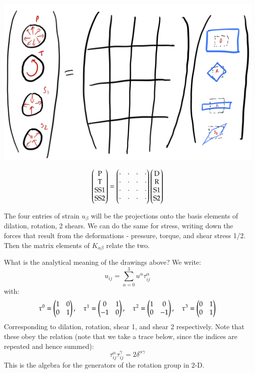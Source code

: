 \begin{center}
    \includegraphics[scale=0.35]{Lectures/Images/lec2-stiffnessmatrix.png}
\end{center}
\begin{equation}
    \begin{pmatrix}\text{P} \\ \text{T} \\ \text{SS1} \\ \text{SS2}\end{pmatrix} = \begin{pmatrix}\cdot & \cdot & \cdot & \cdot \\ \cdot & \cdot & \cdot & \cdot \\ \cdot & \cdot & \cdot & \cdot \\ \cdot & \cdot & \cdot & \cdot\end{pmatrix}\begin{pmatrix}\text{D} \\ \text{R} \\ \text{S1} \\ \text{S2}\end{pmatrix}
\end{equation}

The four entries of strain $u_{\beta}$ will be the projections onto the basis elements of dilation, rotation, 2 shears. We can do the same for stress, writing down the forces that result from the deformations - pressure, torque, and shear stress 1/2. Then the matrix elements of $K_{\alpha\beta}$ relate the two.

What is the analytical meaning of the drawings above? We write:
\begin{equation}
    u_{ij} = \sum_{\alpha=0}^3 u^\alpha \tau_{ij}^\alpha
\end{equation}
with:
\begin{equation}
    \tau^0 = \begin{pmatrix}1 & 0 \\ 0 & 1\end{pmatrix}, \quad \tau^1 = \begin{pmatrix}0 & 1 \\ -1 & 0\end{pmatrix}, \quad \tau^2 = \begin{pmatrix}1 & 0 \\ 0 & -1\end{pmatrix}, \quad \tau^3 = \begin{pmatrix}0 & 1 \\ 0 & 1\end{pmatrix}
\end{equation}
Corresponding to dilation, rotation, shear 1, and shear 2 respectively. Note that these obey the relation (note that we take a trace below, since the indices are repeated and hence summed):
\begin{equation}
    \boxed{\tau_{ij}^\alpha \tau_{ij}^\gamma = 2\delta^{\alpha\gamma}}
\end{equation}
This is the algebra for the generators of the rotation group in 2-D.

